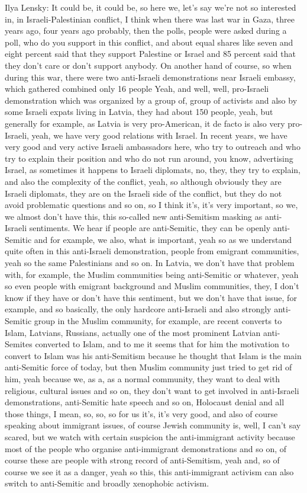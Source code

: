 Ilya Lensky: It could be, it could be, so here we, let’s say we’re not so interested in, in Israeli-Palestinian conflict, I think when there was last war in Gaza, three years ago, four years ago probably, then the polls, people were asked during a poll, who do you support in this conflict, and about equal shares like seven and eight percent said that they support Palestine or Israel and 85 percent said that they don’t care or don’t support anybody. On another hand of course, so when during this war, there were two anti-Israeli demonstrations near Israeli embassy, which gathered combined only 16 people 
Yeah, and well, well, pro-Israeli demonstration which was organized by a group of, group of activists and also by some Israeli expats living in Latvia, they had about 150 people, yeah, but generally for example, as Latvia is very pro-American, it de facto is also very pro-Israeli, yeah, we have very good relations with Israel. In recent years, we have very good and very active Israeli ambassadors here, who try to outreach and who try to explain their position and who do not run around, you know, advertising Israel, as sometimes it happens to Israeli diplomats, no, they, they try to explain, and also the complexity of the conflict, yeah, so although obviously they are Israeli diplomats, they are on the Israeli side of the conflict, but they do not avoid problematic questions and so on, so I think it’s, it’s very important, so we, we almost don’t have this, this so-called new anti-Semitism masking as anti-Israeli sentiments. We hear if people are anti-Semitic, they can be openly anti-Semitic and for example, we also, what is important, yeah so as we understand quite often in this anti-Israeli demonstration,  people from emigrant communities, yeah so the same Palestinians and so on. In Latvia, we don’t have that problem with, for example, the Muslim communities being anti-Semitic or whatever, yeah so even people with emigrant background and Muslim communities, they, I don’t know if they have or don’t have this sentiment, but we don’t have that issue, for example, and so basically, the only hardcore anti-Israeli and also strongly anti-Semitic group in the Muslim community, for example, are recent converts to Islam, Latvians, Russians, actually one of the most prominent Latvian anti-Semites converted to Islam, and to me it seems that for him the motivation to convert to Islam was his anti-Semitism because he thought that Islam is the main anti-Semitic force of today, but then Muslim community just tried to get rid of him, yeah because we, as a, as a normal community, they want to deal with religious, cultural issues and so on, they don’t want to get involved in anti-Israeli demonstrations, anti-Semitic hate speech and so on, Holocaust denial and all those things, I mean, so, so, so for us it’s, it’s very good, and also of course speaking about immigrant issues, of course Jewish community is, well, I can’t say scared, but we watch with certain suspicion the anti-immigrant activity because most of the people who organise anti-immigrant demonstrations and so on, of course these are people with strong record of anti-Semitism, yeah and, so of course we see it as a danger, yeah so this, this anti-immigrant activism can also switch to anti-Semitic and broadly xenophobic activism. 

